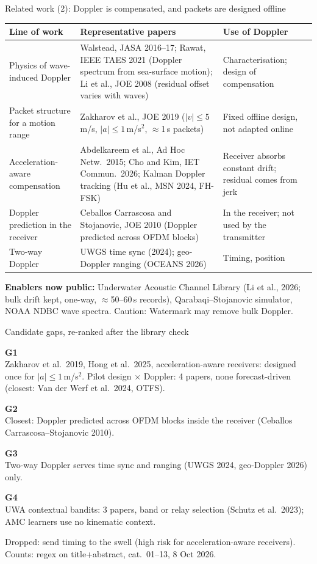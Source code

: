 \documentclass[aspectratio=169,11pt]{beamer}
\newcommand{\gapbox}[3]{%
  \begin{tcolorbox}[colback=foam!60,colframe=foam!60,arc=2mm,boxrule=0pt,left=2mm,right=2mm,top=0.6mm,bottom=0.6mm,before skip=0.8mm,after skip=0.8mm]
  {\bfseries\color{teal}#1}\hspace{1mm}{\small\bfseries #2}\\
  {\footnotesize #3}
  \end{tcolorbox}}
\begin{document}
\begin{frame}{Related work (2): Doppler is compensated, and packets are designed offline}
\scriptsize\setlength{\tabcolsep}{3pt}\renewcommand{\arraystretch}{0.9}
\begin{tabular}{@{}L{0.21\textwidth}L{0.45\textwidth}L{0.30\textwidth}@{}}
\toprule
\textbf{Line of work} & \textbf{Representative papers} & \textbf{Use of Doppler}\\
\midrule
Physics of wave-induced Doppler & Walstead, JASA 2016--17; Rawat, IEEE TAES 2021 (Doppler spectrum from sea-surface motion); Li et al., JOE 2008 (residual offset varies with waves) & Characterisation; design of compensation\\
Packet structure for a motion range & Zakharov et al., JOE 2019 ($|v|\le5$\,m/s, $|a|\le1$\,m/s$^2$, $\approx$1\,s packets) & \textcolor{amber!85!black}{Fixed offline design}, not adapted online\\
Acceleration-aware compensation & Abdelkareem et al., Ad Hoc Netw.\ 2015; Cho and Kim, IET Commun.\ 2026; Kalman Doppler tracking (Hu et al., MSN 2024, FH-FSK) & Receiver absorbs constant drift; residual comes from jerk\\
Doppler prediction in the receiver & Ceballos Carrascosa and Stojanovic, JOE 2010 (Doppler predicted across OFDM blocks) & In the receiver; \textcolor{amber!85!black}{not used by the transmitter}\\
Two-way Doppler & UWGS time sync (2024); geo-Doppler ranging (OCEANS 2026) & Timing, position\\
\bottomrule
\end{tabular}

\vspace{0.5mm}
\scriptsize\textbf{Enablers now public:} Underwater Acoustic Channel Library (Li et al., 2026; bulk drift kept, one-way, $\approx$50--60\,s records), Qarabaqi--Stojanovic simulator, NOAA NDBC wave spectra. \alert{Caution:} Watermark may remove bulk Doppler.
\end{frame}

\begin{frame}{Candidate gaps, re-ranked after the library check}
\gapbox{G1}{Pilot layout and packet length are fixed offline for an assumed motion range}{Zakharov et al.\ 2019, Hong et al.\ 2025, acceleration-aware receivers: designed once for $|a|\le1$\,m/s$^2$. Pilot design $\times$ Doppler: 4 papers, none forecast-driven (closest: Van der Werf et al.\ 2024, OTFS).}
\gapbox{G2}{Receivers re-estimate Doppler on every packet, without a kinematic prior}{Closest: Doppler predicted across OFDM blocks inside the receiver (Ceballos Carrascosa--Stojanovic 2010).}
\gapbox{G3}{Doppler measured at both ends is not fused for the link}{Two-way Doppler serves time sync and ranging (UWGS 2024, geo-Doppler 2026) only.}
\gapbox{G4}{Learning link adaptation ignores kinematic context and arm-dependent delay}{UWA contextual bandits: 3 papers, band or relay selection (Schutz et al.\ 2023); AMC learners use no kinematic context.}
{\tiny\color{mute} Dropped: send timing to the swell (high risk for acceleration-aware receivers). Counts: regex on title+abstract, cat.\ 01--13, 8 Oct 2026.}
\end{frame}
\end{document}
